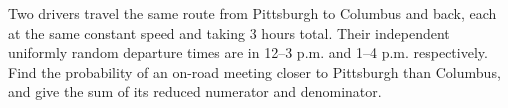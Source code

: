 Two drivers travel the same route from Pittsburgh to Columbus and back, each at the same constant speed and taking 3 hours total. Their independent uniformly random departure times are in 12--3 p.m. and 1--4 p.m. respectively. Find the probability of an on-road meeting closer to Pittsburgh than Columbus, and give the sum of its reduced numerator and denominator.
